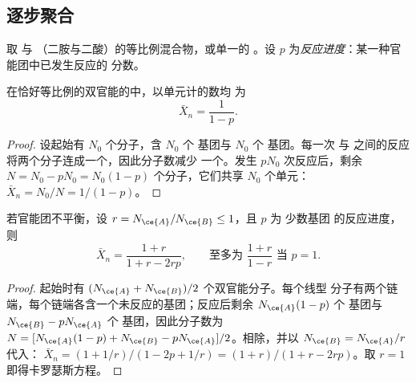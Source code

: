 \subsection*{逐步聚合}

取  与  （二胺与二酸）的等比例混合物，或单一的
 。设 $p$ 为\emph{反应进度}：某一种官能团中已发生反应的
分数。

\begin{theorem}[卡罗瑟斯方程]\label{thm:b2:polymer-synthesis:carothers}
在恰好等比例的双官能的中，以单元计的数均
为
\begin{equation*}
\bar X_n = \frac{1}{1 - p}.
\end{equation*}
\end{theorem}

\begin{proof}
设起始有 $N_0$ 个分子，含 $N_0$ 个  基团与 $N_0$ 个  基团。每一次
 与  之间的反应将两个分子连成一个，因此分子数减少
一个。发生 $pN_0$ 次反应后，剩余 $N = N_0 - pN_0 = N_0(1-p)$ 个分子，它们共享
$N_0$ 个单元：$\bar X_n = N_0/N = 1/(1-p)$。
\end{proof}

\begin{corollary}[不平衡]\label{cor:b2:polymer-synthesis:imbalance}
若官能团不平衡，设 $r = N_{\ce{A}}/N_{\ce{B}} \le 1$，且 $p$ 为
少数基团  的反应进度，则
\begin{equation*}
\bar X_n = \frac{1 + r}{1 + r - 2rp}, \qquad \text{至多为 } \frac{1+r}{1-r} \text{ 当 } p = 1.
\end{equation*}
\end{corollary}

\begin{proof}
起始时有 $(N_{\ce{A}} + N_{\ce{B}})/2$ 个双官能分子。每个线型
分子有两个链端，每个链端各含一个未反应的基团；反应后剩余 $N_{\ce{A}}(1-p)$
个  基团与 $N_{\ce{B}} - pN_{\ce{A}}$ 个  基团，因此分子数为 $N = [N_{\ce{A}}(1-p) + N_{\ce{B}} -
pN_{\ce{A}}]/2$。相除，并以 $N_{\ce{B}} = N_{\ce{A}}/r$ 代入：
$\bar X_n = (1 + 1/r)/(1 - 2p + 1/r) = (1+r)/(1 + r - 2rp)$。取 $r = 1$ 即得卡罗瑟斯方程。
\end{proof}

